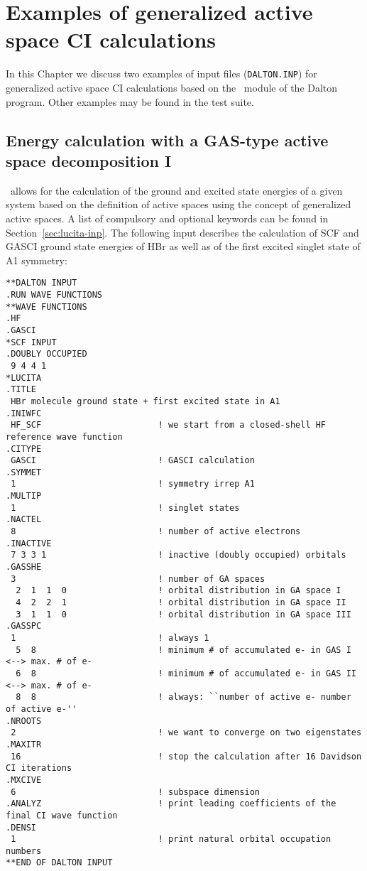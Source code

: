 \chapter{Examples of generalized active space CI calculations}
\label{ch:lucitaexamples}

In this Chapter we discuss two examples of input files (\verb|DALTON.INP|) 
for generalized active space CI calculations based on the \lucita\ module 
of the Dalton program. Other examples may be found in the test suite. 

\section{Energy calculation with a GAS-type active space decomposition I}
%
\lucita\  allows for the calculation of the ground and excited state energies
of a given system based on the definition of active spaces using the concept of generalized active spaces. 
A list of compulsory and optional keywords can be found in Section~\ref{sec:lucita-inp}. 
The following input describes the calculation of SCF and GASCI ground state energies of HBr as well as of the 
first excited singlet state of A1 symmetry:

%
\begin{verbatim}
**DALTON INPUT
.RUN WAVE FUNCTIONS
**WAVE FUNCTIONS
.HF
.GASCI
*SCF INPUT
.DOUBLY OCCUPIED
 9 4 4 1
*LUCITA
.TITLE
 HBr molecule ground state + first excited state in A1
.INIWFC
 HF_SCF                       ! we start from a closed-shell HF reference wave function
.CITYPE
 GASCI                        ! GASCI calculation
.SYMMET
 1                            ! symmetry irrep A1
.MULTIP
 1                            ! singlet states
.NACTEL
 8                            ! number of active electrons
.INACTIVE
 7 3 3 1                      ! inactive (doubly occupied) orbitals
.GASSHE
 3                            ! number of GA spaces
  2  1  1  0                  ! orbital distribution in GA space I
  4  2  2  1                  ! orbital distribution in GA space II
  3  1  1  0                  ! orbital distribution in GA space III
.GASSPC
 1                            ! always 1
  5  8                        ! minimum # of accumulated e- in GAS I   <--> max. # of e-
  6  8                        ! minimum # of accumulated e- in GAS II  <--> max. # of e-
  8  8                        ! always: ``number of active e- number of active e-''
.NROOTS
 2                            ! we want to converge on two eigenstates
.MAXITR
 16                           ! stop the calculation after 16 Davidson CI iterations
.MXCIVE
 6                            ! subspace dimension
.ANALYZ                       ! print leading coefficients of the final CI wave function
.DENSI
 1                            ! print natural orbital occupation numbers
**END OF DALTON INPUT
\end{verbatim}

